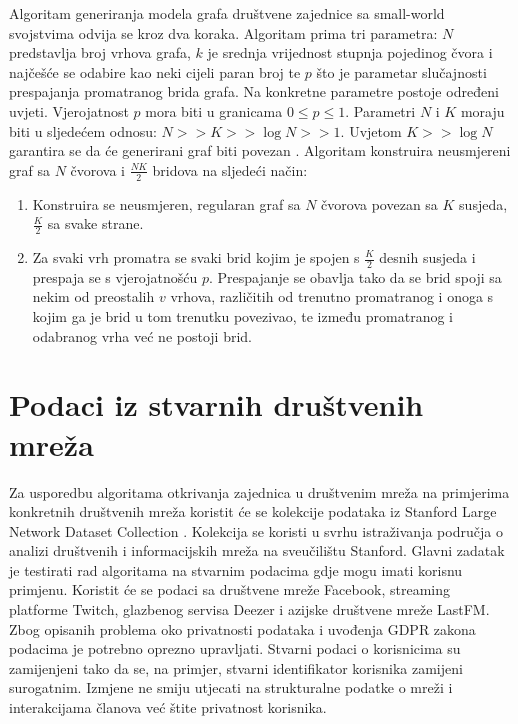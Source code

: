 Algoritam generiranja modela grafa društvene zajednice sa small-world svojstvima odvija se kroz dva koraka. Algoritam prima tri parametra: $N$ predstavlja broj vrhova grafa, $k$ je srednja vrijednost stupnja pojedinog čvora i najčešće se odabire kao neki cijeli paran broj te $p$ što je parametar slučajnosti prespajanja promatranog brida grafa. Na konkretne parametre postoje određeni uvjeti. Vjerojatnost $p$ mora biti u granicama $0 \leq p \leq 1$. Parametri $N$ i $K$ moraju biti u sljedećem odnosu: $N >> K >> \log N >> 1$. Uvjetom $ K >> \log N$ garantira se da će generirani graf biti povezan \cite{Bollobas2001}. Algoritam konstruira neusmjereni graf sa $N$ čvorova i $\frac{NK}{2}$ bridova na sljedeći način:

\begin{enumerate}
	\item Konstruira se neusmjeren, regularan graf sa $N$ čvorova povezan sa $K$ susjeda, $\frac{K}{2}$ sa svake strane.
	\item Za svaki vrh promatra se svaki brid kojim je spojen s $\frac{K}{2}$ desnih susjeda i prespaja se s vjerojatnošću $p$. Prespajanje se obavlja tako da se brid spoji sa nekim od preostalih $v$ vrhova, različitih od trenutno promatranog i onoga s kojim ga je brid u tom trenutku povezivao, te između promatranog i odabranog vrha već ne postoji brid.
\end{enumerate}



\section{Podaci iz stvarnih društvenih mreža} \label{real_data}

Za usporedbu algoritama otkrivanja zajednica u društvenim mreža na primjerima konkretnih društvenih mreža koristit će se kolekcije podataka iz Stanford Large Network Dataset Collection \cite{snapnets}. Kolekcija se koristi u svrhu istraživanja područja o analizi društvenih i informacijskih mreža na sveučilištu Stanford. Glavni zadatak je testirati rad algoritama na stvarnim podacima gdje mogu imati korisnu primjenu. Koristit će se podaci sa društvene mreže Facebook, streaming platforme Twitch, glazbenog servisa Deezer i azijske društvene mreže LastFM. Zbog opisanih problema oko privatnosti podataka i uvođenja GDPR zakona podacima je potrebno oprezno upravljati. Stvarni podaci o korisnicima su zamijenjeni tako da se, na primjer, stvarni identifikator korisnika zamijeni surogatnim. Izmjene ne smiju utjecati na strukturalne podatke o mreži i interakcijama članova već štite privatnost korisnika.

